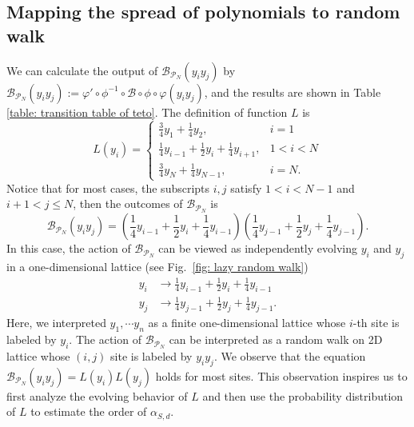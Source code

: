 \documentclass[showpacs,onecolumn,aps,prx,long bibliography,superscriptaddress,notitlepage]{revtex4-1}
\begin{document}
\subsection{Mapping the spread of polynomials to random walk}
\label{sec: mapping the action of tensors to random walk}

\newcommand{\teto}{\mathcal{B}_{\mathcal{P}_N}}
We can calculate the output of $\teto (y_iy_j)$ by $\teto(y_i y_j) := \varphi' \circ \phi^{-1} \circ \mathcal{B}\circ \phi \circ \varphi(y_i y_j)$, and the results are shown in Table \ref{table: transition table of teto}. The definition of function $L$ is
\begin{equation}
\label{eq: lazy random walk L}
L\left(y_i\right)=
\begin{cases}
\frac{3}{4} y_1+\frac{1}{4} y_2, &i=1 \\
\frac{1}{4} y_{i-1}+\frac{1}{2} y_i+\frac{1}{4} y_{i+1}, &1<i<N \\
\frac{3}{4} y_N+\frac{1}{4} y_{N-1}, &i=N. 
\end{cases}
\end{equation}
Notice that for most cases, the subscripts $i,j$ satisfy $1<i<N-1$ and $i+1<j\leq N$, then the outcomes of $\teto$ is
\begin{equation}
    \label{eq: zz anonymous 5}
    \teto (y_iy_j) = \left(\frac{1}{4} y_{i-1} + \frac{1}{2}y_i + \frac{1}{4} y_{i-1}\right)\left( \frac{1}{4} y_{j-1} + \frac{1}{2}y_j + \frac{1}{4} y_{j-1} \right).
\end{equation}
In this case, the action of $\teto$ can be viewed as independently evolving $y_i$ and $y_j$ in a one-dimensional lattice (see Fig.~\ref{fig: lazy random walk})
\begin{equation}
\label{eq: separate evolution}
    \begin{aligned}
        y_i &\to \frac{1}{4} y_{i-1} + \frac{1}{2}y_i + \frac{1}{4} y_{i-1}\\
    y_j &\to \frac{1}{4} y_{j-1} + \frac{1}{2}y_j + \frac{1}{4} y_{j-1}.
    \end{aligned}
\end{equation}
Here, we interpreted $y_1, \cdots y_n$ as a finite one-dimensional lattice whose $i$-th site is labeled by $y_i$. The action of $\mathcal{B}_{\mathcal{P}_N}$ can be interpreted as a random walk on 2D lattice whose $(i,j)$ site is labeled by $y_iy_j$. 
We observe that the equation $\mathcal{B}_{\mathcal{P}_N}(y_iy_j) = L(y_i)L(y_j)$ holds for most sites. This observation inspires us to first analyze the evolving behavior of $L$ and then use the probability distribution of $L$ to estimate the order of $\alpha_{S,d}$.
\end{document}

